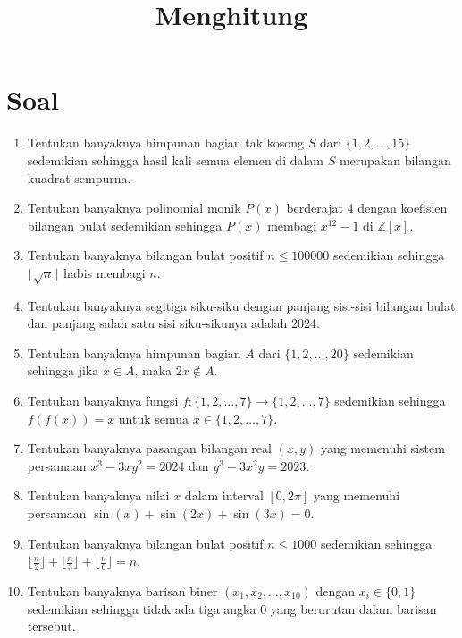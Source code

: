 \documentclass[12pt]{scrartcl}
\title{Menghitung}
\begin{document}
\renewcommand*\contentsname{Daftar Isi}
\tableofcontents

\newpage

\section*{Soal}
\begin{enumerate}

\item Tentukan banyaknya himpunan bagian tak kosong $S$ dari $\{1, 2, \dots, 15\}$ sedemikian sehingga hasil kali semua elemen di dalam $S$ merupakan bilangan kuadrat sempurna.


\item Tentukan banyaknya polinomial monik $P(x)$ berderajat 4 dengan koefisien bilangan bulat sedemikian sehingga $P(x)$ membagi $x^{12} - 1$ di $\mathbb{Z}[x]$.


\item Tentukan banyaknya bilangan bulat positif $n \le 100000$ sedemikian sehingga $\lfloor \sqrt{n} \rfloor$ habis membagi $n$.


\item Tentukan banyaknya segitiga siku-siku dengan panjang sisi-sisi bilangan bulat dan panjang salah satu sisi siku-sikunya adalah 2024.


\item Tentukan banyaknya himpunan bagian $A$ dari $\{1, 2, \dots, 20\}$ sedemikian sehingga jika $x \in A$, maka $2x \notin A$.


\item Tentukan banyaknya fungsi $f: \{1, 2, \dots, 7\} \to \{1, 2, \dots, 7\}$ sedemikian sehingga $f(f(x)) = x$ untuk semua $x \in \{1, 2, \dots, 7\}$.


\item Tentukan banyaknya pasangan bilangan real $(x,y)$ yang memenuhi sistem persamaan $x^3 - 3xy^2 = 2024$ dan $y^3 - 3x^2y = 2023$.


\item Tentukan banyaknya nilai $x$ dalam interval $[0, 2\pi]$ yang memenuhi persamaan $\sin(x) + \sin(2x) + \sin(3x) = 0$.


\item Tentukan banyaknya bilangan bulat positif $n \le 1000$ sedemikian sehingga $\lfloor \frac{n}{2} \rfloor + \lfloor \frac{n}{3} \rfloor + \lfloor \frac{n}{6} \rfloor = n$.


\item Tentukan banyaknya barisan biner $(x_1, x_2, \dots, x_{10})$ dengan $x_i \in \{0, 1\}$ sedemikian sehingga tidak ada tiga angka 0 yang berurutan dalam barisan tersebut.
\end{enumerate}
\end{document}
